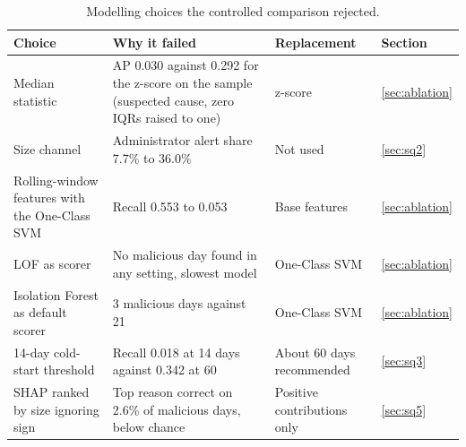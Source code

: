 \documentclass[a4paper,12pt]{article}
\begin{document}
\begin{table}[htbp]
\centering
\caption{Modelling choices the controlled comparison rejected.}
\label{tab:failures}
\footnotesize
\setlength{\tabcolsep}{3pt}
\begin{tabular}{@{}R{2.8cm} R{5.0cm} R{3.7cm} l@{}}
\toprule
\textbf{Choice} & \textbf{Why it failed} & \textbf{Replacement} & \textbf{Section} \\
\midrule
Median statistic & AP 0.030 against 0.292 for the z-score on the sample (suspected cause, zero IQRs raised to one) & z-score & \ref{sec:ablation} \\
Size channel & Administrator alert share 7.7\% to 36.0\% & Not used & \ref{sec:sq2} \\
Rolling-window features with the One-Class SVM & Recall 0.553 to 0.053 & Base features & \ref{sec:ablation} \\
LOF as scorer & No malicious day found in any setting, slowest model & One-Class SVM & \ref{sec:ablation} \\
Isolation Forest as default scorer & 3 malicious days against 21 & One-Class SVM & \ref{sec:ablation} \\
14-day cold-start threshold & Recall 0.018 at 14 days against 0.342 at 60 & About 60 days recommended & \ref{sec:sq3} \\
SHAP ranked by size ignoring sign & Top reason correct on 2.6\% of malicious days, below chance & Positive contributions only & \ref{sec:sq5} \\
\bottomrule
\end{tabular}
\end{table}
\end{document}
